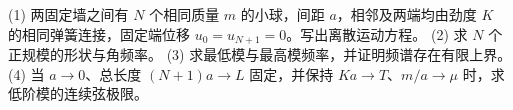 (1) 两固定墙之间有 \(N\) 个相同质量 \(m\) 的小球，间距 \(a\)，相邻及两端均由劲度 \(K\) 的相同弹簧连接，固定端位移 \(u_0=u_{N+1}=0\)。写出离散运动方程。
(2) 求 \(N\) 个正规模的形状与角频率。
(3) 求最低模与最高模频率，并证明频谱存在有限上界。
(4) 当 \(a\to0\)、总长度 \((N+1)a\to L\) 固定，并保持 \(K a\to T\)、\(m/a\to\mu\) 时，求低阶模的连续弦极限。
